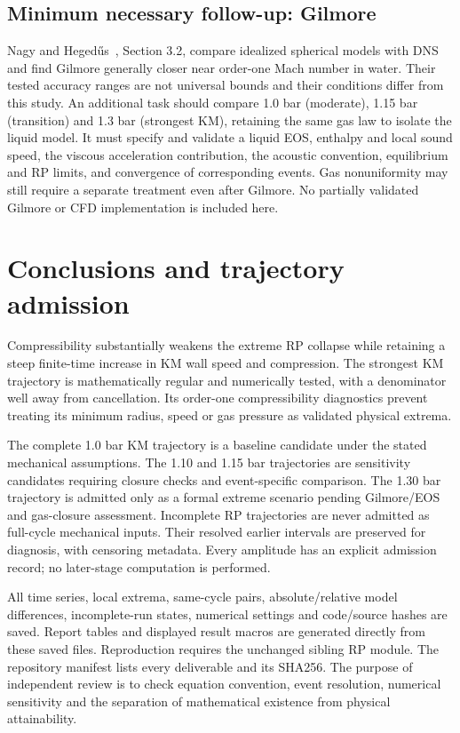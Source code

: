 \documentclass[10pt,a4paper]{article}
\begin{document}
\subsection{Minimum necessary follow-up: Gilmore}
Nagy and Heged\H us~\cite{nagy}, Section 3.2, compare idealized spherical models with DNS and find Gilmore generally closer near order-one Mach number in water. Their tested accuracy ranges are not universal bounds and their conditions differ from this study. An additional task should compare 1.0 bar (moderate), 1.15 bar (transition) and 1.3 bar (strongest KM), retaining the same gas law to isolate the liquid model. It must specify and validate a liquid EOS, enthalpy and local sound speed, the viscous acceleration contribution, the acoustic convention, equilibrium and RP limits, and convergence of corresponding events. Gas nonuniformity may still require a separate treatment even after Gilmore. No partially validated Gilmore or CFD implementation is included here.

\newpage
\section{Conclusions and trajectory admission}
Compressibility substantially weakens the extreme RP collapse while retaining a steep finite-time increase in KM wall speed and compression. The strongest KM trajectory is mathematically regular and numerically tested, with a denominator well away from cancellation. Its order-one compressibility diagnostics prevent treating its minimum radius, speed or gas pressure as validated physical extrema.

The complete 1.0 bar KM trajectory is a baseline candidate under the stated mechanical assumptions. The 1.10 and 1.15 bar trajectories are sensitivity candidates requiring closure checks and event-specific comparison. The 1.30 bar trajectory is admitted only as a formal extreme scenario pending Gilmore/EOS and gas-closure assessment. Incomplete RP trajectories are never admitted as full-cycle mechanical inputs. Their resolved earlier intervals are preserved for diagnosis, with censoring metadata. Every amplitude has an explicit admission record; no later-stage computation is performed.

All time series, local extrema, same-cycle pairs, absolute/relative model differences, incomplete-run states, numerical settings and code/source hashes are saved. Report tables and displayed result macros are generated directly from these saved files. Reproduction requires the unchanged sibling RP module. The repository manifest lists every deliverable and its SHA256. The purpose of independent review is to check equation convention, event resolution, numerical sensitivity and the separation of mathematical existence from physical attainability.
\end{document}
